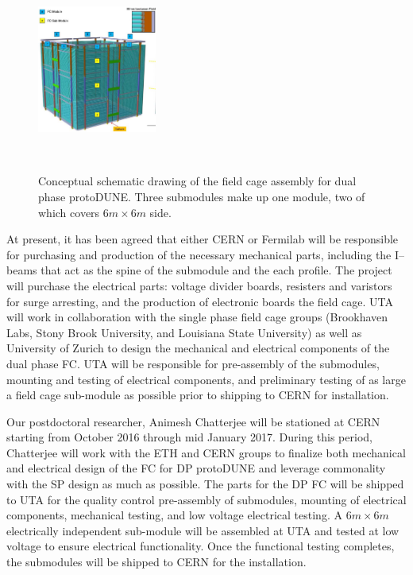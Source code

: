 \begin{figure}[htb]
\centering
\includegraphics[width=0.35\textwidth]{images/if-dp-fc.jpg}
\caption[]{Conceptual schematic drawing of the field cage assembly for dual phase protoDUNE. Three submodules make up one module, two of which covers $6m\times 6m$ side. }
~\label{fig:if-dp-fc}
\end{figure}

At present, it has been agreed that either CERN or Fermilab will be responsible for purchasing and production of the necessary mechanical parts, including the I--beams that act as the spine of the submodule and the each profile.  The project will purchase the electrical parts: voltage divider boards, resisters and varistors for surge arresting, and the production of electronic boards the field cage. UTA will work in collaboration with the single phase field cage groups (Brookhaven Labs, Stony Brook University, and Louisiana State University) as well as University of Zurich to design the mechanical and electrical components of the dual phase FC. UTA will be responsible for pre-assembly of the submodules, mounting and testing of electrical components, and preliminary testing of as large a field cage sub-module as possible prior to shipping to CERN for installation.

Our postdoctoral researcher, Animesh Chatterjee will be stationed at CERN starting from October 2016 through mid January 2017.  During this period, Chatterjee will work with the ETH and CERN groups to finalize both mechanical and electrical design of the FC for DP protoDUNE and leverage commonality with the SP design as much as possible. The parts for the DP FC will be shipped to UTA for the quality control pre-assembly of submodules, mounting of electrical components, mechanical testing, and low voltage electrical testing. A $6m\times 6m$ electrically independent sub-module will be assembled at UTA and tested at low voltage to ensure electrical functionality. Once the functional testing completes, the submodules will be shipped to CERN for the installation.

